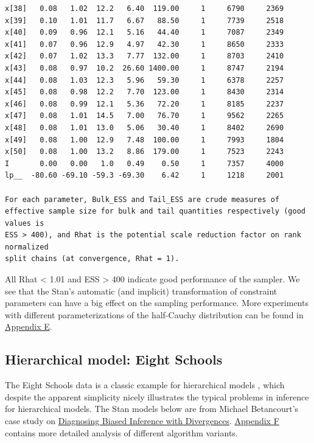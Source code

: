 \documentclass[american,]{article}
\begin{document}
\begin{verbatim}
x[38]   0.08   1.02  12.2   6.40  119.00     1     6790     2369
x[39]   0.10   1.01  11.7   6.67   88.50     1     7739     2518
x[40]   0.09   0.96  12.1   5.16   44.40     1     7087     2349
x[41]   0.07   0.96  12.9   4.97   42.30     1     8650     2333
x[42]   0.07   1.02  13.3   7.77  132.00     1     8703     2410
x[43]   0.08   0.97  10.2  26.60 1400.00     1     8747     2194
x[44]   0.08   1.03  12.3   5.96   59.30     1     6378     2257
x[45]   0.08   0.98  12.2   7.70  123.00     1     8430     2314
x[46]   0.08   0.99  12.1   5.36   72.20     1     8185     2237
x[47]   0.08   1.01  14.5   7.00   76.70     1     9562     2265
x[48]   0.08   1.01  13.0   5.06   30.40     1     8402     2690
x[49]   0.08   1.00  12.9   7.48  100.00     1     7993     1804
x[50]   0.08   1.00  13.2   8.86  179.00     1     7523     2243
I       0.00   0.00   1.0   0.49    0.50     1     7357     4000
lp__  -80.60 -69.10 -59.3 -69.30    6.42     1     1218     2001

For each parameter, Bulk_ESS and Tail_ESS are crude measures of 
effective sample size for bulk and tail quantities respectively (good values is 
ESS > 400), and Rhat is the potential scale reduction factor on rank normalized
split chains (at convergence, Rhat = 1).
\end{verbatim}

All Rhat \textless{} 1.01 and ESS \textgreater{} 400 indicate good
performance of the sampler. We see that the Stan's automatic (and
implicit) transformation of constraint parameters can have a big effect
on the sampling performance. More experiments with different
parameterizations of the half-Cauchy distribution can be found in
\protect\hyperlink{AppendixE}{Appendix E}.

\hypertarget{eightschools}{%
\subsection{Hierarchical model: Eight Schools}\label{eightschools}}

The Eight Schools data is a classic example for hierarchical models
\citep[see Section 5.5 in][]{BDA3}, which despite the apparent
simplicity nicely illustrates the typical problems in inference for
hierarchical models. The Stan models below are from Michael Betancourt's
case study on
\href{http://mc-stan.org/users/documentation/case-studies/divergences_and_bias.html}{Diagnosing
Biased Inference with Divergences}.
\protect\hyperlink{AppendixF}{Appendix F} contains more detailed
analysis of different algorithm variants.
\end{document}
